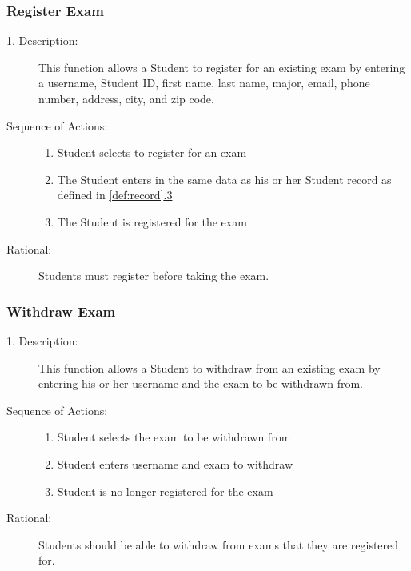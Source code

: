 \subsubsection{\large Register Exam} 
\begin{boxed} %
      \begin{description}
         \item[1. Description:\label{desc:register_exam}]
   This function allows a Student to register for an existing exam by entering a
   username, Student ID, first name, last name, major, email, phone number,
   address, city, and zip code.
         
            \item[Sequence of Actions:]\hspace{10cm}
         \begin{enumerate}
            \item Student selects to register for an exam
            \item The Student enters in the same data as his or her Student
               record as defined in \autoref{def:record}\hyperref[def:record]{.3}
            \item The Student is registered for the exam
         \end{enumerate}

            \item[Rational:]
               Students must register before taking the exam.
      \end{description}
   \end{boxed} %

   \subsubsection{\large Withdraw Exam} 
   \begin{boxed} %
      \begin{description}
         \item[1. Description:\label{desc:withdraw_exam}]
      This function allows a Student to withdraw from an existing exam by
      entering his or her username and the exam to be withdrawn from.
         
            \item[Sequence of Actions:]\hspace{10cm}
         \begin{enumerate}
            \item Student selects the exam to be withdrawn from
            \item Student enters username and exam to withdraw
            \item Student is no longer registered for the exam
         \end{enumerate}

            \item[Rational:]
               Students should be able to withdraw from exams that they are
               registered for.
      \end{description}
   \end{boxed} %

